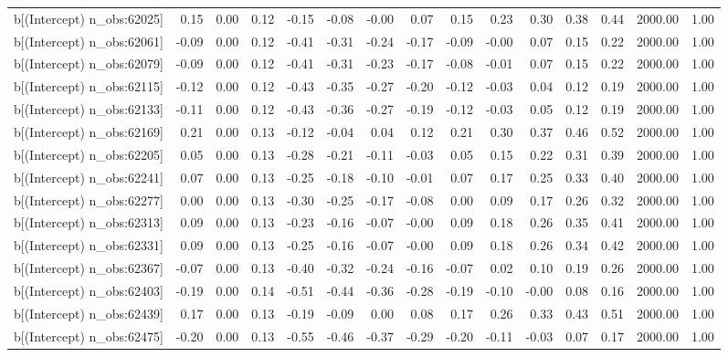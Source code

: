 \begin{table}[ht]
\begin{tabular}{rrrrrrrrrrrrrrr}
  b[(Intercept) n\_obs:62025] & 0.15 & 0.00 & 0.12 & -0.15 & -0.08 & -0.00 & 0.07 & 0.15 & 0.23 & 0.30 & 0.38 & 0.44 & 2000.00 & 1.00 \\ 
  b[(Intercept) n\_obs:62061] & -0.09 & 0.00 & 0.12 & -0.41 & -0.31 & -0.24 & -0.17 & -0.09 & -0.00 & 0.07 & 0.15 & 0.22 & 2000.00 & 1.00 \\ 
  b[(Intercept) n\_obs:62079] & -0.09 & 0.00 & 0.12 & -0.41 & -0.31 & -0.23 & -0.17 & -0.08 & -0.01 & 0.07 & 0.15 & 0.22 & 2000.00 & 1.00 \\ 
  b[(Intercept) n\_obs:62115] & -0.12 & 0.00 & 0.12 & -0.43 & -0.35 & -0.27 & -0.20 & -0.12 & -0.03 & 0.04 & 0.12 & 0.19 & 2000.00 & 1.00 \\ 
  b[(Intercept) n\_obs:62133] & -0.11 & 0.00 & 0.12 & -0.43 & -0.36 & -0.27 & -0.19 & -0.12 & -0.03 & 0.05 & 0.12 & 0.19 & 2000.00 & 1.00 \\ 
  b[(Intercept) n\_obs:62169] & 0.21 & 0.00 & 0.13 & -0.12 & -0.04 & 0.04 & 0.12 & 0.21 & 0.30 & 0.37 & 0.46 & 0.52 & 2000.00 & 1.00 \\ 
  b[(Intercept) n\_obs:62205] & 0.05 & 0.00 & 0.13 & -0.28 & -0.21 & -0.11 & -0.03 & 0.05 & 0.15 & 0.22 & 0.31 & 0.39 & 2000.00 & 1.00 \\ 
  b[(Intercept) n\_obs:62241] & 0.07 & 0.00 & 0.13 & -0.25 & -0.18 & -0.10 & -0.01 & 0.07 & 0.17 & 0.25 & 0.33 & 0.40 & 2000.00 & 1.00 \\ 
  b[(Intercept) n\_obs:62277] & 0.00 & 0.00 & 0.13 & -0.30 & -0.25 & -0.17 & -0.08 & 0.00 & 0.09 & 0.17 & 0.26 & 0.32 & 2000.00 & 1.00 \\ 
  b[(Intercept) n\_obs:62313] & 0.09 & 0.00 & 0.13 & -0.23 & -0.16 & -0.07 & -0.00 & 0.09 & 0.18 & 0.26 & 0.35 & 0.41 & 2000.00 & 1.00 \\ 
  b[(Intercept) n\_obs:62331] & 0.09 & 0.00 & 0.13 & -0.25 & -0.16 & -0.07 & -0.00 & 0.09 & 0.18 & 0.26 & 0.34 & 0.42 & 2000.00 & 1.00 \\ 
  b[(Intercept) n\_obs:62367] & -0.07 & 0.00 & 0.13 & -0.40 & -0.32 & -0.24 & -0.16 & -0.07 & 0.02 & 0.10 & 0.19 & 0.26 & 2000.00 & 1.00 \\ 
  b[(Intercept) n\_obs:62403] & -0.19 & 0.00 & 0.14 & -0.51 & -0.44 & -0.36 & -0.28 & -0.19 & -0.10 & -0.00 & 0.08 & 0.16 & 2000.00 & 1.00 \\ 
  b[(Intercept) n\_obs:62439] & 0.17 & 0.00 & 0.13 & -0.19 & -0.09 & 0.00 & 0.08 & 0.17 & 0.26 & 0.33 & 0.43 & 0.51 & 2000.00 & 1.00 \\ 
  b[(Intercept) n\_obs:62475] & -0.20 & 0.00 & 0.13 & -0.55 & -0.46 & -0.37 & -0.29 & -0.20 & -0.11 & -0.03 & 0.07 & 0.17 & 2000.00 & 1.00 \\ 

\end{tabular}
\end{table}
